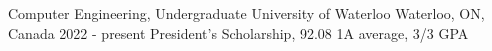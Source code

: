 

\begin{cventries}

  \cventry
    {Computer Engineering, Undergraduate} %
    {University of Waterloo} %
    {Waterloo, ON, Canada} %
    {2022 - present} %
    {President's Scholarship, 92.08 1A average, 3/3 GPA}

\end{cventries}
